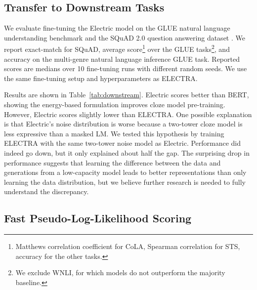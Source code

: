 \documentclass[11pt,a4paper]{article}
\begin{document}
\subsection{Transfer to Downstream Tasks}

We evaluate fine-tuning the Electric model on the GLUE natural language understanding benchmark \cite{wang2018glue} and the SQuAD 2.0 question answering dataset \cite{rajpurkar2018know}. 
We report exact-match for SQuAD, average score\footnote{Matthews correlation coefficient for CoLA, Spearman correlation for STS, accuracy for the other tasks.} over the GLUE tasks\footnote{We exclude WNLI, for which models do not outperform the majority baseline.}, and accuracy on the multi-genre natural language inference GLUE task.
Reported scores are medians over 10 fine-tuning runs with different random seeds.
We use the same fine-tuning setup and hyperparameters as ELECTRA.

Results are shown in Table~\ref{tab:downstream}.
Electric scores better than BERT, showing the energy-based formulation improves cloze model pre-training.
However, Electric scores slightly lower than ELECTRA.
One possible explanation is that Electric's noise distribution is worse because a two-tower cloze model is less expressive than a masked LM.
We tested this hypothesis by training ELECTRA with the same two-tower noise model as Electric. Performance did indeed go down, but it only explained about half the gap.
The surprising drop in performance suggests that learning the difference between the data and generations from a low-capacity model leads to better representations than only learning the data distribution, but we believe further research is needed to fully understand the discrepancy.   


\subsection{Fast Pseudo-Log-Likelihood Scoring}
\label{sec:pll}
\end{document}
